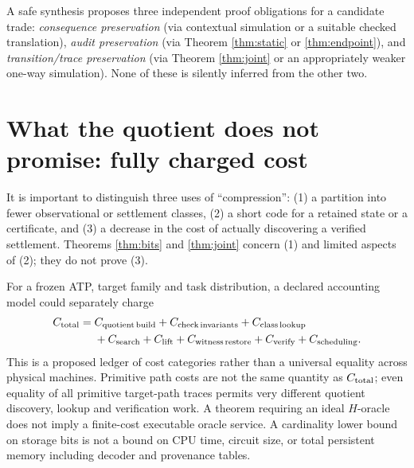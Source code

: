 \documentclass[11pt,letterpaper]{article}
\theoremstyle{definition}
\begin{document}
A safe synthesis proposes three independent proof obligations for a candidate trade: \emph{consequence preservation} (via contextual simulation or a suitable checked translation), \emph{audit preservation} (via Theorem \ref{thm:static} or \ref{thm:endpoint}), and \emph{transition/trace preservation} (via Theorem \ref{thm:joint} or an appropriately weaker one-way simulation). None of these is silently inferred from the other two.

\section{What the quotient does not promise: fully charged cost}\label{sec:economics}
It is important to distinguish three uses of ``compression'': (1) a partition into fewer observational or settlement classes, (2) a short code for a retained state or a certificate, and (3) a decrease in the cost of actually discovering a verified settlement. Theorems \ref{thm:bits} and \ref{thm:joint} concern (1) and limited aspects of (2); they do not prove (3).

For a frozen ATP, target family and task distribution, a declared accounting model could separately charge
\begin{align*}
C_{\rm total}={}&C_{\rm quotient\,build}+C_{\rm check\,invariants}+C_{\rm class\,lookup}\\
&+C_{\rm search}+C_{\rm lift}+C_{\rm witness\,restore}+C_{\rm verify}+C_{\rm scheduling}.
\end{align*}
This is a proposed ledger of cost categories rather than a universal equality across physical machines. Primitive path costs are not the same quantity as $C_{\rm total}$; even equality of all primitive target-path traces permits very different quotient discovery, lookup and verification work. A theorem requiring an ideal $H$-oracle does not imply a finite-cost executable oracle service. A cardinality lower bound on storage bits is not a bound on CPU time, circuit size, or total persistent memory including decoder and provenance tables.
\end{document}
